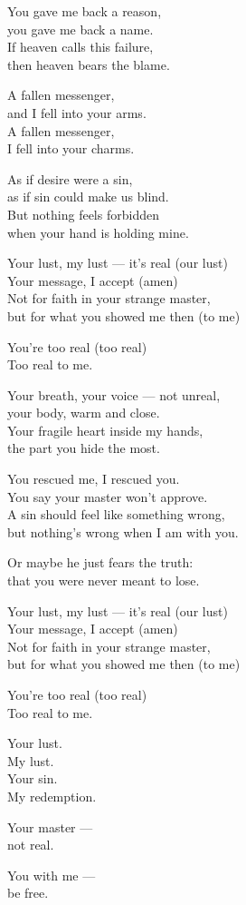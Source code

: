 \begin{lyrics}
You gave me back a reason,\\
you gave me back a name.\\
If heaven calls this failure,\\
then heaven bears the blame.

A fallen messenger,\\
and I fell into your arms.\\
A fallen messenger,\\
I fell into your charms.

As if desire were a sin,\\
as if sin could make us blind.\\
But nothing feels forbidden\\
when your hand is holding mine.

Your lust, my lust — it's real (our lust)\\
Your message, I accept (amen)\\
Not for faith in your strange master,\\
but for what you showed me then (to me)

You're too real (too real)\\
Too real to me.


Your breath, your voice — not unreal,\\
your body, warm and close.\\
Your fragile heart inside my hands,\\
the part you hide the most.

You rescued me, I rescued you.\\
You say your master won't approve.\\
A sin should feel like something wrong,\\
but nothing's wrong when I am with you.

Or maybe he just fears the truth:\\
that you were never meant to lose.

Your lust, my lust — it's real (our lust)\\
Your message, I accept (amen)\\
Not for faith in your strange master,\\
but for what you showed me then (to me)

You're too real (too real)\\
Too real to me.

Your lust.\\
My lust.\\
Your sin.\\
My redemption.

Your master —\\
not real.

You with me —\\
be free.
\end{lyrics}

